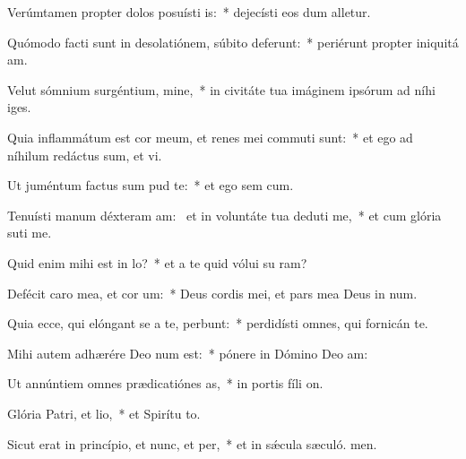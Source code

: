 \item Verúmtamen propter dolos posuísti is:~* dejecísti eos dum alletur.
\item Quómodo facti sunt in desolatiónem, súbito deferunt:~* periérunt propter iniquitá am.
\item Velut sómnium surgéntium, mine,~* in civitáte tua imáginem ipsórum ad níhi iges.
\item Quia inflammátum est cor meum, et renes mei commuti sunt:~* et ego ad níhilum redáctus sum, et vi.
\item Ut juméntum factus sum pud te:~* et ego sem cum.
\item Tenuísti manum déxteram am:~\pscross{} et in voluntáte tua deduti me,~* et cum glória suti me.
\item Quid enim mihi est in lo?~* et a te quid vólui su ram?
\item Defécit caro mea, et cor um:~* Deus cordis mei, et pars mea Deus in num.
\item Quia ecce, qui elóngant se a te, perbunt:~* perdidísti omnes, qui fornicán  te.
\item Mihi autem adhærére Deo num est:~* pónere in Dómino Deo  am:
\item Ut annúntiem omnes prædicatiónes as,~* in portis fíli on.
\item Glória Patri, et lio,~* et Spirítu to.
\item Sicut erat in princípio, et nunc, et per,~* et in sǽcula sæculó. men.
